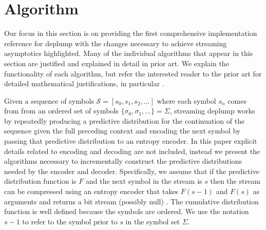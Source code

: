 \section{Algorithm}
\newcommand{\T}{\ensuremath{\mathcal{T}}}
\newcommand{\N}{\ensuremath{\mathcal{N}}}
\newcommand{\M}{\ensuremath{\mathcal{M}}}
\newcommand{\PP}{\ensuremath{\mathcal{P}}}
\newcommand{\nc}{\ensuremath{nc}}
\newcommand{\RS}{\ensuremath{\mathcal{R}}}
\newcommand{\D}{\ensuremath{\mathcal{D}}}
\newcommand{\la}{\ensuremath{\leftarrow}}
\newcommand{\G}{\ensuremath{\mathcal{G}}}
\newcommand{\IS}{\ensuremath{\mathcal{I}}}
\newcommand{\Seq}{\ensuremath{\mathcal{S}}}
\newcommand{\dd}{\ensuremath{\delta}}
%
%
Our focus in this section is on providing the first comprehensive implementation reference for deplump with the changes necessary to achieve streaming asymptotics highlighted.  Many of the individual algorithms that appear in this section are justified and explained in detail in prior art.  We explain the functionality of each algorithm, but refer the interested reader to the prior art for detailed mathematical justifications, in particular \citep{Wood2009,Gasthaus2010,Bartlett2010}.

Given a sequence of symbols $\Seq = [s_0, s_1, s_2, \ldots]$ where each symbol $s_n$ comes from from an ordered set of symbols $\{\sigma_0, \sigma_1, \ldots\} = \Sigma$,  streaming deplump works by repeatedly producing a predictive distribution for the continuation of the sequence given the full preceding context and encoding the next symbol by passing that predictive distribution to an entropy encoder.  In this paper explicit details related to encoding and decoding are not included, instead we present the algorithms necessary to incrementally construct the predictive distributions needed by the encoder and decoder.  Specifically, we assume that if the predictive distribution function is $F$ and the next symbol in the stream is $s$ then the stream can be compressed using an entropy encoder that takes $F(s-1)$ and $F(s)$ as arguments and returns a bit stream (possibly null) \citep{Witten1987}.   The cumulative distribution function is well defined because the symbols are ordered. We use the notation $s-1$ to refer to the symbol prior to $s$ in the symbol set $\Sigma$.  %


